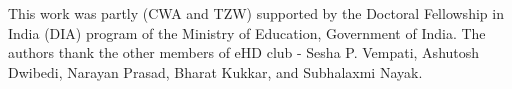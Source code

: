 \documentclass[%
 reprint,
 amsmath,amssymb,
 aps,
]{revtex4-2}
\begin{document}
%
%
%
    \begin{acknowledgments}
    This work was partly (CWA and TZW) supported by the Doctoral Fellowship in India (DIA) program of the Ministry of Education, Government of India. The authors thank the other members of eHD club - Sesha P. Vempati, Ashutosh Dwibedi, Narayan Prasad, Bharat Kukkar, and Subhalaxmi Nayak.
    \end{acknowledgments} 
%
    \appendix
\end{document}
